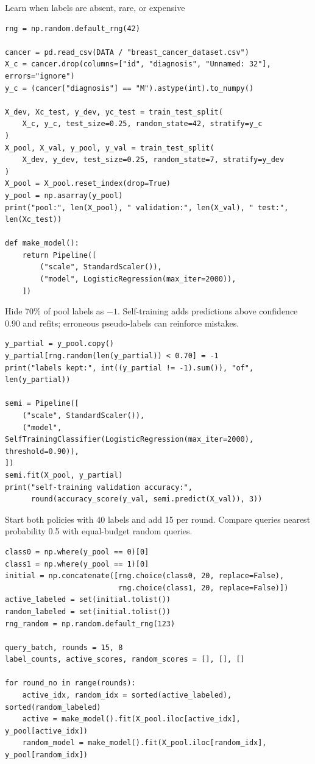 \begin{labproject}{Learn when labels are absent, rare, or expensive}
\begin{lstlisting}[style=utppython]
rng = np.random.default_rng(42)

cancer = pd.read_csv(DATA / "breast_cancer_dataset.csv")
X_c = cancer.drop(columns=["id", "diagnosis", "Unnamed: 32"], errors="ignore")
y_c = (cancer["diagnosis"] == "M").astype(int).to_numpy()

X_dev, Xc_test, y_dev, yc_test = train_test_split(
    X_c, y_c, test_size=0.25, random_state=42, stratify=y_c
)
X_pool, X_val, y_pool, y_val = train_test_split(
    X_dev, y_dev, test_size=0.25, random_state=7, stratify=y_dev
)
X_pool = X_pool.reset_index(drop=True)
y_pool = np.asarray(y_pool)
print("pool:", len(X_pool), " validation:", len(X_val), " test:", len(Xc_test))

def make_model():
    return Pipeline([
        ("scale", StandardScaler()),
        ("model", LogisticRegression(max_iter=2000)),
    ])
\end{lstlisting}

Hide 70\% of pool labels as $-1$. Self-training adds predictions above confidence 0.90 and refits; erroneous pseudo-labels can reinforce mistakes.

\begin{lstlisting}[style=utppython]
y_partial = y_pool.copy()
y_partial[rng.random(len(y_partial)) < 0.70] = -1
print("labels kept:", int((y_partial != -1).sum()), "of", len(y_partial))

semi = Pipeline([
    ("scale", StandardScaler()),
    ("model", SelfTrainingClassifier(LogisticRegression(max_iter=2000), threshold=0.90)),
])
semi.fit(X_pool, y_partial)
print("self-training validation accuracy:",
      round(accuracy_score(y_val, semi.predict(X_val)), 3))
\end{lstlisting}

Start both policies with 40 labels and add 15 per round. Compare queries nearest probability 0.5 with equal-budget random queries.

\begin{lstlisting}[style=utppython]
class0 = np.where(y_pool == 0)[0]
class1 = np.where(y_pool == 1)[0]
initial = np.concatenate([rng.choice(class0, 20, replace=False),
                          rng.choice(class1, 20, replace=False)])
active_labeled = set(initial.tolist())
random_labeled = set(initial.tolist())
rng_random = np.random.default_rng(123)

query_batch, rounds = 15, 8
label_counts, active_scores, random_scores = [], [], []

for round_no in range(rounds):
    active_idx, random_idx = sorted(active_labeled), sorted(random_labeled)
    active = make_model().fit(X_pool.iloc[active_idx], y_pool[active_idx])
    random_model = make_model().fit(X_pool.iloc[random_idx], y_pool[random_idx])


\end{lstlisting}
\end{labproject}
